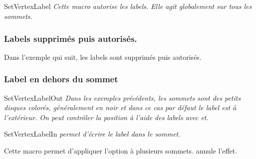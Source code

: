 \begin{tkzexample}[latex=7cm,small]
\end{tkzexample} 

\subsection{}  
\begin{NewMacroBox}{SetVertexLabel}{}
\emph{ Cette macro autorise les labels. Elle agit globalement sur tous les sommets.}
\end{NewMacroBox} 

\subsubsection{Labels  supprimés puis autorisés.} 
 Dans l'exemple qui suit, les labels sont supprimés puis autorisés.
 
\begin{tkzexample}[latex=7cm,small]
\end{tkzexample}

\subsubsection{Label en dehors du sommet }

\begin{NewMacroBox}{SetVertexLabelOut}{}
\emph{ Dans les exemples précédents, les sommets sont des petits disques colorés, généralement en noir et dans ce cas par défaut le label est à l'extérieur.  On peut contrôler la position à l'aide des labels avec    et.}
\end{NewMacroBox}

\begin{NewMacroBox}{SetVertexLabelIn}{}
\emph{ permet d'écrire le label dans le sommet.}
\end{NewMacroBox}   

Cette macro permet d'appliquer l'option à plusieurs  sommets.  annule l'effet.

\begin{tkzexample}[latex=7cm,small]
\end{tkzexample}

\endinput